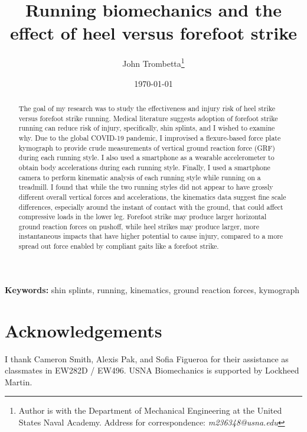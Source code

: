 \documentclass[10pt]{article}
\title{Running biomechanics and the effect of heel versus forefoot strike}
\author{John Trombetta\thanks{Author is with the Department of Mechanical Engineering at the United States Naval Academy. Address for correspondence: \emph{m236348@usna.edu}}}
\date{\today}
\begin{document}
\maketitle
\begin{abstract}
The goal of my research was to study the effectiveness and injury risk of heel strike versus forefoot strike running. Medical literature suggests adoption of forefoot strike running can reduce risk of injury, specifically, shin splints, and I wished to examine why. Due to the global COVID-19 pandemic, I improvised a flexure-based force plate kymograph to provide crude measurements of vertical ground reaction force (GRF) during each running style. I also used a smartphone as a wearable accelerometer to obtain body accelerations during each running style. Finally, I used a smartphone camera to perform kinematic analysis of each running style while running on a treadmill. I found that while the two running styles did not appear to have grossly different overall vertical forces and accelerations, the kinematics data suggest fine scale differences, especially around the instant of contact with the ground, that could affect compressive loads in the lower leg. Forefoot strike may produce larger horizontal ground reaction forces on pushoff, while heel strikes may produce larger, more instantaneous impacts that have higher potential to cause injury, compared to a more spread out force enabled by compliant gaits like a forefoot strike.  
\end{abstract}
{\scriptsize\textbf{Keywords: }shin splints, running, kinematics, ground reaction forces, kymograph}


\section{Acknowledgements}
I thank Cameron Smith, Alexis Pak, and Sofia Figueroa for their assistance as classmates in EW282D / EW496. USNA Biomechanics is supported by Lockheed Martin. 



%
\end{document}
